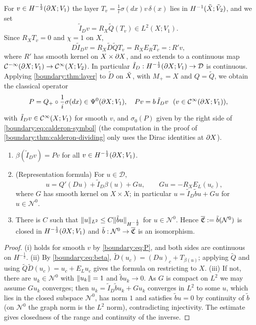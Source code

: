 For $v\in H^{-\frac12}(\partial X;V_1)$ the layer $T_v=\frac1i\sigma(dx)v\,\delta(x)$ lies
in $H^{-1}(\tilde{X};\tilde V_2)$, and we set
\begin{equation*}
\tilde I_Dv=R_X\tilde Q(T_v)\in L^2(X;V_1).
\end{equation*}
Since $R_XT_v=0$ and $\chi=1$ on $X$,
\begin{equation}\label{boundary:eq:Rprime}
D\tilde I_Dv=R_X\tilde D\tilde QT_v=R_XE_RT_v=:R'v,
\end{equation}
where $R'$ has smooth kernel on $X\times\partial X$, and so extends to a continuous map
$\mathcal{C}^{-\infty}(\partial X;V_1)\to\mathcal{C}^\infty(X;V_2)$. In particular $\tilde I_D:H^{-\frac12}(\partial X;V_1)\to
\mathcal{D}$ is continuous. Applying \cref{boundary:thm:layer} to $\tilde D$ on $\tilde{X}$,
with $M_+=X$ and $Q=\tilde Q$, we obtain the classical operator
\begin{equation}\label{boundary:eq:P}
P=Q_+\circ\frac1i\sigma(dx)\in\Psi^{0}(\partial X;V_1),\quad Pv=b\,\tilde I_Dv\ \ (v\in
\mathcal{C}^\infty(\partial X;V_1)),
\end{equation}
with $\tilde I_Dv\in\mathcal{C}^\infty(X;V_1)$ for smooth $v$, and $\sigma_0(P)$ given by the right
side of \eqref{boundary:eq:calderon-symbol} (the computation in the proof of
\cref{boundary:thm:calderon-dividing} only uses the Dirac identities at $\partial X$).

\begin{lemma}\label{boundary:lem:repr}
\begin{enumerate}[label=(\roman*)]
\item $\beta(\tilde I_Dv)=Pv$ for all $v\in H^{-\frac12}(\partial X;V_1)$.
\item (Representation formula) For $u\in\mathcal{D}$,
\begin{equation*}
u=Q'(Du)+\tilde I_D\beta(u)+Gu,\qquad Gu=-R_XE_L(u_c),
\end{equation*}
where $G$ has smooth kernel on $X\times X$; in particular $u=\tilde I_D\tilde b u+Gu$
for $u\in\mathcal{N}^0$.
\item There is $C$ such that $\lVert u\rVert_{L^2}\le C\lVert \tilde bu\rVert_{H^{-\frac12}}$ for
$u\in\mathcal{N}^0$. Hence $\overline{\mathfrak{C}}:=\tilde b(\mathcal{N}^0)$ is closed in
$H^{-\frac12}(\partial X;V_1)$ and $\tilde b:\mathcal{N}^0\to\overline{\mathfrak{C}}$ is an
isomorphism.
\end{enumerate}
\end{lemma}
\begin{proof}
(i) holds for smooth $v$ by \eqref{boundary:eq:P}, and both sides are continuous on
$H^{-\frac12}$. (ii) By \eqref{boundary:eq:beta}, $\tilde D(u_c)=(Du)_c+T_{\beta(u)}$;
applying $\tilde Q$ and using $\tilde Q\tilde D(u_c)=u_c+E_Lu_c$ gives the formula on
restricting to $X$. (iii) If not, there are $u_k\in\mathcal{N}^0$ with $\lVert u_k\rVert=1$
and $\tilde bu_k\to0$. As $G$ is compact on $L^2$ we may assume $Gu_k$ converges; then
$u_k=\tilde I_D\tilde bu_k+Gu_k$ converges in $L^2$ to some $u$, which lies in the
closed subspace $\mathcal{N}^0$, has norm $1$ and satisfies $\tilde bu=0$ by
continuity of $\tilde b$ (on $\mathcal N^0$ the graph norm is the $L^2$ norm),
contradicting injectivity. The estimate gives closedness of the range and continuity
of the inverse.
\end{proof}

